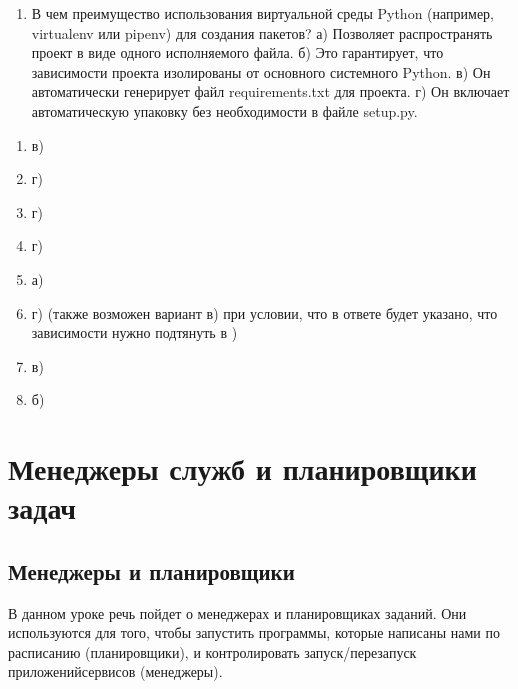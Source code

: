 \documentclass[letterpaper,10pt,russian]{sphinxmanual}
\begin{document}
\begin{enumerate}
\item {} 
\sphinxAtStartPar
В чем преимущество использования виртуальной среды Python (например, virtualenv или pipenv) для создания пакетов?
а) Позволяет распространять проект в виде одного исполняемого файла.
б) Это гарантирует, что зависимости проекта изолированы от основного системного Python.
в) Он автоматически генерирует файл requirements.txt для проекта.
г) Он включает автоматическую упаковку без необходимости в файле setup.py.

\end{enumerate}

\sphinxAtStartPar
{}
\begin{enumerate}
%
\item {} 
\sphinxAtStartPar
в)

\item {} 
\sphinxAtStartPar
г)

\item {} 
\sphinxAtStartPar
г)

\item {} 
\sphinxAtStartPar
г)

\item {} 
\sphinxAtStartPar
а)

\item {} 
\sphinxAtStartPar
г) (также возможен вариант в) при условии, что в ответе будет указано, что зависимости нужно подтянуть в )

\item {} 
\sphinxAtStartPar
в)

\item {} 
\sphinxAtStartPar
б)

\end{enumerate}


\chapter{Менеджеры служб и планировщики задач}
\label{\detokenize{index:id16}}
\sphinxstepscope


\section{Менеджеры и планировщики}
\label{\detokenize{educational_materials/managers/content:id1}}\label{\detokenize{educational_materials/managers/content::doc}}
\sphinxAtStartPar
В данном уроке речь пойдет о менеджерах и планировщиках заданий. Они используются для того, чтобы запустить программы, которые написаны нами по расписанию (планировщики), и контролировать запуск/перезапуск приложений\sphinxhyphen{}сервисов (менеджеры).
\end{document}
